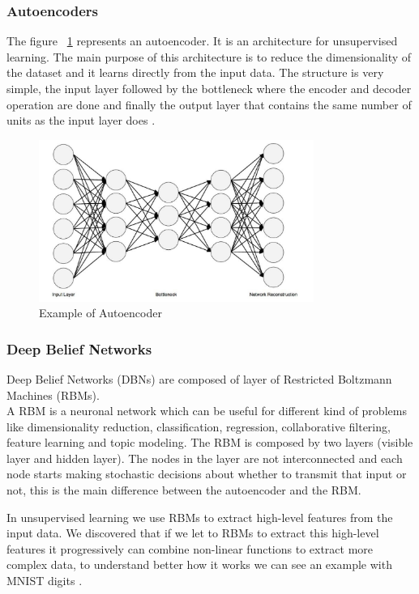 \subsubsection[Autoencoders]{Autoencoders}

The figure ~\ref{fig:autoencoder} represents an autoencoder. It is an architecture for unsupervised learning. The main purpose of this architecture is to reduce the dimensionality of the dataset and it learns directly from the input data. 
The structure is very simple, the input layer followed by the bottleneck where the encoder and decoder operation are done and finally the output layer that contains the same number of units as the input layer does \cite{dp4j-deep-learning}.

\begin{figure}[H]
\centering
\includegraphics[width=0.8\textwidth]{./figures/autoencoder}
\caption{Example of Autoencoder \cite{dp4j-deep-learning}}
\label{fig:autoencoder}
\end{figure}


\subsubsection[Deep Belief Networks]{Deep Belief Networks}
Deep Belief Networks (DBNs) are composed of layer of Restricted Boltzmann Machines (RBMs).\\
A RBM is a neuronal network which can be useful for different kind of problems like dimensionality reduction, classification, regression, collaborative filtering, feature learning and topic modeling. The RBM is composed by two layers (visible layer and hidden layer). The nodes in the layer are not interconnected and each node starts making  stochastic decisions about whether to transmit that input or not, this is the main difference between the autoencoder and the RBM.

In unsupervised learning we use RBMs to extract high-level features from the input data. We discovered that if we let to RBMs to extract this high-level features it progressively can combine non-linear functions to extract more complex data, to understand better how it works we can see an example with MNIST digits \cite{dp4j-deep-learning}.


